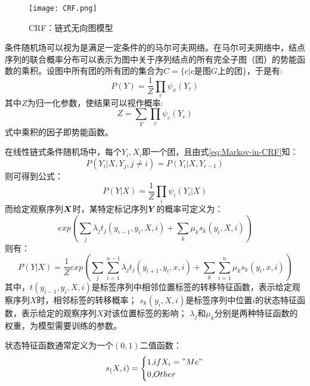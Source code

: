 \begin{figure}[!htpb]
    \centering
    \texttt{[image: CRF.png]}
    \caption{CRF：链式无向图模型}
    \label{fig:CRF}
\end{figure}

条件随机场可以视为是满足一定条件的的马尔可夫网络。在马尔可夫网络中，结点序列的联合概率分布可以表示为图中关于序列结点的所有完全子图（团）的势能函数的乘积。设图中所有团的所有团的集合为$C = \{c|c$是图$G$上的团$\}$，于是有:
\begin{equation}
    P(Y) = \dfrac{1}{Z}\prod_{c}\psi_x(Y_c)
\end{equation}
其中$Z$为归一化参数，使结果可以视作概率:
\begin{equation}
    Z = \sum_Y\prod_c \psi_c(Y_c)
\end{equation}
式中乘积的因子即势能函数。

在线性链式条件随机场中，每个${Y_i, X_i}$即一个团，且由式\ref{eq:Markov-in-CRF}知：
\begin{equation}
    P(Y_i|X, Y_j, j\neq i) = P(Y_i|X, Y_{i-1})
\end{equation}
则可得到公式：
\begin{equation}
    P(Y|X) = \dfrac{1}{Z}\prod_i\psi_i(Y_i|X)
\end{equation}
而给定观察序列$\boldsymbol{X}$时，某特定标记序列$\boldsymbol{Y}$的概率可定义为：
\begin{equation}
    exp(\sum_j\lambda_j t_j(y_{i-1}, y_i, X, i) + \sum_k \mu_k s_k(y_i, X, i))
\end{equation}
则有：
\begin{equation}
    P(Y|X) = \dfrac{1}{Z}exp(\sum_j\sum_{i=1}^{n-1}\lambda_j t_j(y_{i+1}, y_i, x, i) + \sum_k\sum_{i=1}^{n}\mu_k s_k(y_i, x, i))
\end{equation}
其中，$t(y_{i-1}, y_i, X, i)$是标签序列中相邻位置标签的转移特征函数，表示给定观察序列$X$时，相邻标签的转移概率；
$s_k(y_i, X, i)$是标签序列中位置$i$的状态特征函数，表示给定的观察序列$X$对该位置标签的影响；
$\lambda_j$和$\mu_k$分别是两种特征函数的权重，为模型需要训练的参数。

状态特征函数通常定义为一个$(0,1)$二值函数：
\begin{equation}
    s_(X, i) = \left\{
        \begin{aligned}
            1, &if X_i = "Me"\\
            0, &Other
        \end{aligned}
    \right.
\end{equation}

